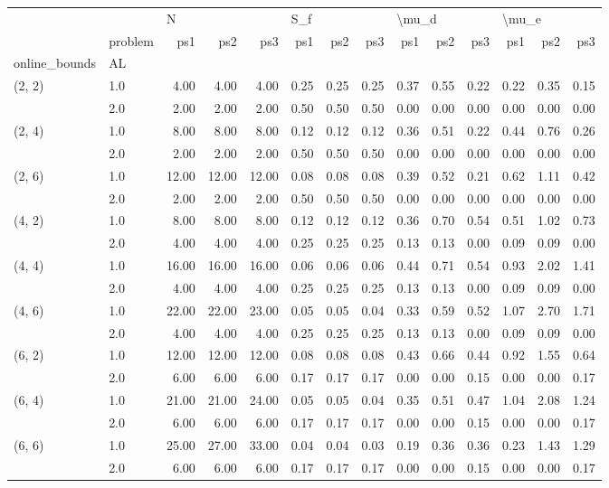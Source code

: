 \begin{tabular}{llrrrrrrrrrrrr}
\toprule
       & {} & \multicolumn{3}{l}{N} & \multicolumn{3}{l}{S\_f} & \multicolumn{3}{l}{\textbackslash mu\_d} & \multicolumn{3}{l}{\textbackslash mu\_e} \\
       & problem &   ps1 &   ps2 &   ps3 &  ps1 &  ps2 &  ps3 &   ps1 &  ps2 &  ps3 &   ps1 &  ps2 &  ps3 \\
online\_bounds & AL &       &       &       &      &      &      &       &      &      &       &      &      \\
\midrule
(2, 2) & 1.0 &  4.00 &  4.00 &  4.00 & 0.25 & 0.25 & 0.25 &  0.37 & 0.55 & 0.22 &  0.22 & 0.35 & 0.15 \\
       & 2.0 &  2.00 &  2.00 &  2.00 & 0.50 & 0.50 & 0.50 &  0.00 & 0.00 & 0.00 &  0.00 & 0.00 & 0.00 \\
(2, 4) & 1.0 &  8.00 &  8.00 &  8.00 & 0.12 & 0.12 & 0.12 &  0.36 & 0.51 & 0.22 &  0.44 & 0.76 & 0.26 \\
       & 2.0 &  2.00 &  2.00 &  2.00 & 0.50 & 0.50 & 0.50 &  0.00 & 0.00 & 0.00 &  0.00 & 0.00 & 0.00 \\
(2, 6) & 1.0 & 12.00 & 12.00 & 12.00 & 0.08 & 0.08 & 0.08 &  0.39 & 0.52 & 0.21 &  0.62 & 1.11 & 0.42 \\
       & 2.0 &  2.00 &  2.00 &  2.00 & 0.50 & 0.50 & 0.50 &  0.00 & 0.00 & 0.00 &  0.00 & 0.00 & 0.00 \\
(4, 2) & 1.0 &  8.00 &  8.00 &  8.00 & 0.12 & 0.12 & 0.12 &  0.36 & 0.70 & 0.54 &  0.51 & 1.02 & 0.73 \\
       & 2.0 &  4.00 &  4.00 &  4.00 & 0.25 & 0.25 & 0.25 &  0.13 & 0.13 & 0.00 &  0.09 & 0.09 & 0.00 \\
(4, 4) & 1.0 & 16.00 & 16.00 & 16.00 & 0.06 & 0.06 & 0.06 &  0.44 & 0.71 & 0.54 &  0.93 & 2.02 & 1.41 \\
       & 2.0 &  4.00 &  4.00 &  4.00 & 0.25 & 0.25 & 0.25 &  0.13 & 0.13 & 0.00 &  0.09 & 0.09 & 0.00 \\
(4, 6) & 1.0 & 22.00 & 22.00 & 23.00 & 0.05 & 0.05 & 0.04 &  0.33 & 0.59 & 0.52 &  1.07 & 2.70 & 1.71 \\
       & 2.0 &  4.00 &  4.00 &  4.00 & 0.25 & 0.25 & 0.25 &  0.13 & 0.13 & 0.00 &  0.09 & 0.09 & 0.00 \\
(6, 2) & 1.0 & 12.00 & 12.00 & 12.00 & 0.08 & 0.08 & 0.08 &  0.43 & 0.66 & 0.44 &  0.92 & 1.55 & 0.64 \\
       & 2.0 &  6.00 &  6.00 &  6.00 & 0.17 & 0.17 & 0.17 &  0.00 & 0.00 & 0.15 &  0.00 & 0.00 & 0.17 \\
(6, 4) & 1.0 & 21.00 & 21.00 & 24.00 & 0.05 & 0.05 & 0.04 &  0.35 & 0.51 & 0.47 &  1.04 & 2.08 & 1.24 \\
       & 2.0 &  6.00 &  6.00 &  6.00 & 0.17 & 0.17 & 0.17 &  0.00 & 0.00 & 0.15 &  0.00 & 0.00 & 0.17 \\
(6, 6) & 1.0 & 25.00 & 27.00 & 33.00 & 0.04 & 0.04 & 0.03 &  0.19 & 0.36 & 0.36 &  0.23 & 1.43 & 1.29 \\
       & 2.0 &  6.00 &  6.00 &  6.00 & 0.17 & 0.17 & 0.17 &  0.00 & 0.00 & 0.15 &  0.00 & 0.00 & 0.17 \\
\bottomrule
\end{tabular}
